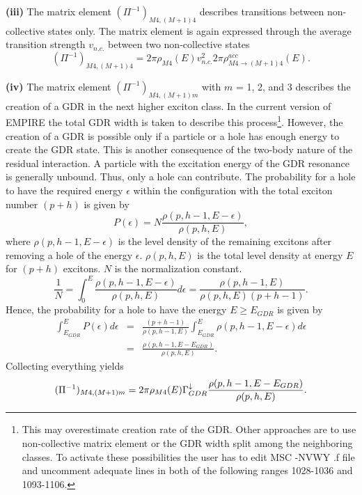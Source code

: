 \smallskip \textbf{(iii)} The matrix element $(\Pi^{-1})_{M4,(M+1)4}$
describes transitions between non-collective states only. The matrix element
is again expressed through the average transition strength $v_{n.c.}$
between two non-collective states
\begin{equation}
(\Pi^{-1})_{M4,(M+1)4}=2\pi\rho_{M4}(E)v_{n.c.}^{2}2\pi\rho_{M4%
\rightarrow(M+1)4}^{acc}(E).
\end{equation}

\smallskip \textbf{(iv)} The matrix element $(\Pi^{-1})_{M4,(M+1)m}$ with $m$
= 1, 2, and 3 describes the creation of a GDR in the next higher exciton
class. In the current version of EMPIRE the total GDR width is taken to
describe this process\footnote{%
This may overestimate creation rate of the GDR. Other approaches are to use
non-collective matrix element or the GDR width split among the neighboring
classes. To activate these possibilities the user has to edit MSC%
-NVWY%
.f file and uncomment adequate lines in both of the following
ranges 1028-1036 and 1093-1106.}. However, the creation of a GDR is possible
only if a particle or a hole has enough energy to create the GDR state. This
is another consequence of the two-body nature of the residual interaction. A
particle with the excitation energy of the GDR resonance is generally
unbound. Thus, only a hole can contribute. The probability for a hole to
have the required energy $\epsilon$ within the configuration with the total
exciton number $(p+h)$ is given by
\begin{equation}
P(\epsilon)=N%
\frac{\rho(p,h-1,E-\epsilon)}{\rho(p,h,E)},
\end{equation}
where $\rho(p,h-1,E-\epsilon)$ is the level density%
 of the remaining excitons after removing a hole
of the energy $\epsilon$. $\rho(p,h,E)$ is the total level density at energy
$E$ for $(p+h)$ excitons. $N$ is the normalization constant.
\begin{equation}
\frac{1}{N}=\int_{0}^{E}\frac{\rho(p,h-1,E-\epsilon)}{\rho(p,h,E)}d\epsilon=%
\frac{\rho(p,h-1,E)}{\rho(p,h,E)(p+h-1)}.
\end{equation}
Hence, the probability for a hole to have the energy $E\geq E_{GDR}$ is
given by
\begin{eqnarray}
\int_{E_{GDR}}^{E}P(\epsilon)d\epsilon & = & \frac{(p+h-1)}{\rho(p,h-1,E)}%
\int_{E_{GDR}}^{E}\rho(p,h-1,E-\epsilon)d\epsilon  \nonumber \\
& = & \frac{\rho(p,h-1,E-E_{GDR})}{\rho(p,h,E)}.
\end{eqnarray}
Collecting everything yields
\begin{equation}
(\Pi^{-1})_{M4,(M+1)m}=2\pi\rho_{M4}(E)\Gamma_{GDR}^{\downarrow}\frac{%
\rho(p,h-1,E-E_{GDR})}{\rho(p,h,E)}.
\end{equation}

